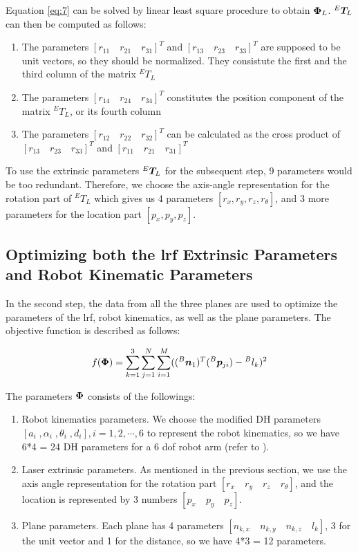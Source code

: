 Equation \eqref{eq:7} can be solved by linear least square procedure to obtain $\vb*{\Phi}_L$. ${^E}\vb*{T}_L$ can then be computed as follows:
\begin{enumerate}
\item The parameters $[r_{11} \quad r_{21} \quad r_{31}]^T$ and $[r_{13} \quad r_{23} \quad r_{33}]^T$ are supposed to be unit vectors, so they should be normalized. They consistute the first and the third column of the matrix ${^E}T_L$
\item The parameters $[r_{14} \quad r_{24} \quad r_{34}]^T$ constitutes the position component of the matrix ${^E}T_L$, or its fourth column
\item The parameters $[r_{12} \quad r_{22} \quad r_{32}]^T$ can be calculated as the cross product of  $[r_{13} \quad r_{23} \quad r_{33}]^T$ and $[r_{11} \quad r_{21} \quad r_{31}]^T$ 
\end{enumerate}

To use the extrinsic parameters ${^E}\vb*{T}_L$ for the subsequent step, 9 parameters would be too redundant. Therefore, we choose the axis-angle representation for the rotation part of ${^E}T_L$ which gives us 4 parameters $[r_x, r_y, r_z, r_{\theta}]$, and 3 more parameters for the location part $[p_x, p_y, p_z]$. 


\subsection{Optimizing both the \ac{lrf} Extrinsic Parameters and Robot Kinematic Parameters}
\label{sec:second_step}
In the second step, the data from all the three planes are used to optimize the parameters of the \ac{lrf}, robot kinematics, as well as the plane parameters. The objective function is described as follows:

\begin{equation}
 f (\vb*{\Phi}) =  \sum_{k=1}^{3} \sum_{j=1}^{N} \sum_{i=1}^{M} (({^B}\vb*{n}_1) ^T ({^B}\vb*{p}_{ji}) - {^B}l_k)^2
\end{equation}

The parameters $\vb*{\Phi}$ consists of the followings:
\begin{enumerate}
\item Robot kinematics parameters. We choose the modified DH parameters \cite{Hayati1985} $[a_i \;, \alpha_i \;,\theta_i \;,d_i], i=1, 2, \cdots ,6$ to represent the robot kinematics, so we have 6*4 = 24 DH parameters for a 6 \ac{dof} robot arm (refer to ). 
\item Laser extrinsic parameters. As mentioned in the previous section, we use the axis angle representation for the rotation part $[r_x \quad r_y \quad r_z \quad r_{\theta}]$, and the location is represented by 3 numbers $[p_x \quad p_y\quad p_z]$. 
\item Plane parameters. Each plane has 4 parameters $[n_{k,x}\quad n_{k,y}\quad n_{k,z} \quad l_{k}]$, 3 for the unit vector and 1 for the distance, so we have 4*3 = 12 parameters. 
\end{enumerate}

